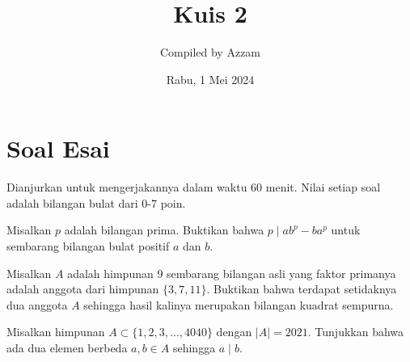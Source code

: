 \documentclass[12pt]{scrartcl}
\begin{document}
	\title{Kuis 2} %
	\date{Rabu, 1 Mei 2024}
	\author{Compiled by Azzam}
	\maketitle

\renewcommand*\contentsname{Daftar Isi}
\tableofcontents

\newpage
	
	
\section{Soal Esai}
Dianjurkan untuk mengerjakannya dalam waktu 60 menit. Nilai setiap soal adalah bilangan bulat dari 0-7 poin.   
\begin{soalbaru} 
    Misalkan $p$ adalah bilangan prima. Buktikan bahwa $p \mid ab^p - ba^p$ untuk sembarang bilangan bulat positif $a$ dan $b$.
\end{soalbaru}

\begin{soalbaru}
    Misalkan $A$ adalah himpunan 9 sembarang bilangan asli yang faktor primanya adalah anggota dari himpunan $\{3,7,11\}$. Buktikan bahwa terdapat setidaknya dua anggota $A$ sehingga hasil kalinya merupakan bilangan kuadrat sempurna.
\end{soalbaru}

\begin{soalbaru}
    Misalkan himpunan $A \subset \{1,2,3,\dots,4040\}$ dengan $|A| = 2021$. Tunjukkan bahwa ada dua elemen berbeda $a,b \in A$ sehingga $a \mid b$.
\end{soalbaru}
    

	
\end{document}
